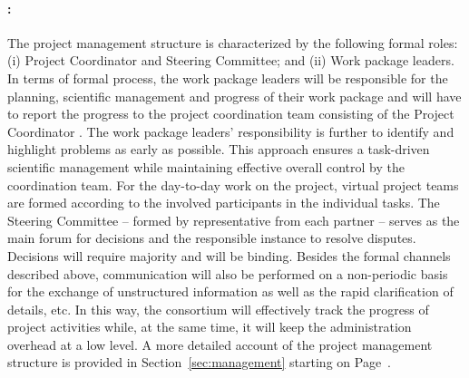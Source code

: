 \paragraph{\textbf{\WPManagement: \WPManagementTitle}}
The \Project{} project management structure is characterized by the following formal roles: (i) Project Coordinator and Steering Committee; and (ii) Work package leaders. In terms of formal process, the work package leaders will be responsible for the planning, scientific management and progress of their work package and will have to report the progress to the project coordination team consisting of the Project Coordinator \Coordinator{}. The work package leaders' responsibility is further to identify and highlight problems as early as possible. This approach ensures a task-driven scientific management while maintaining effective overall control by the coordination team.  For the day-to-day work on the project, virtual project teams are formed according to the involved participants in the individual tasks. The Steering Committee -- formed by representative from each partner -- serves as the main forum for decisions and the responsible instance to resolve disputes. Decisions will require majority and will be binding. Besides the formal channels described above, communication will also be performed on a non-periodic basis for the exchange of unstructured information as well as the rapid clarification of details, etc. In this way, the consortium will effectively track the progress of project activities while, at the same time, it will keep the administration overhead at a low level. A more detailed account of the \Project{} project management structure is provided in Section~\ref{sec:management} starting on Page~\pageref{sec:management}.


